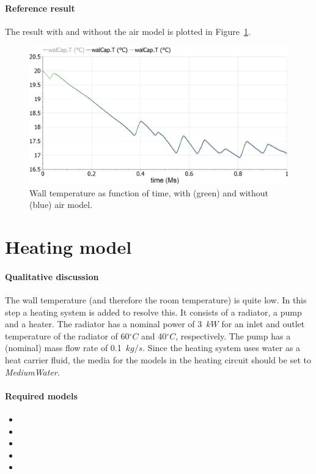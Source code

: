 \documentclass[10pt,a4paper]{article}
\begin{document}
\paragraph{Reference result}
The result with and without the air model is plotted in Figure~\ref{fig:res3}.
\begin{figure}[h]
\centering
\includegraphics[width=0.6\columnwidth]{result3.png}
\caption{Wall temperature as function of time, with (green) and without (blue) air model.}
\label{fig:res3}
\end{figure}



\newpage
\section{Heating model}
\paragraph{Qualitative discussion}
The wall temperature (and therefore the room temperature) is quite low. In this step a heating system is added to resolve this. It consists of a radiator, a pump and a heater. The radiator has a nominal power of 3~$kW$ for an inlet and outlet temperature of the radiator of 60$^{\circ}C$ and 40$^{\circ}C$, respectively. The pump has a (nominal) mass flow rate of 0.1~$kg/s$. Since the heating system uses water as a heat carrier fluid, the media for the models in the heating circuit should be set to \textit{MediumWater}.

\paragraph{Required models}
\begin{itemize}
\item {}
\item {}
\item {}
\item {}
\item {}
\end{itemize}
\end{document}
